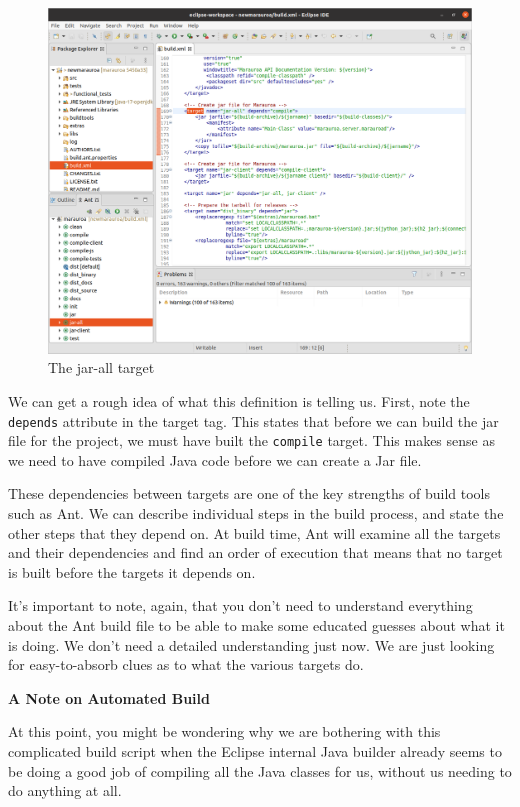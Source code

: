 \documentclass[
]{book}
\begin{document}
\begin{figure}

{\centering \includegraphics[width=1\linewidth]{images/2.1jarallTarget} 

}

\caption{The jar-all target}\label{fig:jarallTarget-fig}
\end{figure}

We can get a rough idea of what this definition is telling us. First, note the \texttt{depends} attribute in the target tag. This states that before we can build the jar file for the project, we must have built the \texttt{compile} target. This makes sense as we need to have compiled Java code before we can create a Jar file.

These dependencies between targets are one of the key strengths of build tools such as Ant. We can describe individual steps in the build process, and state the other steps that they depend on. At build time, Ant will examine all the targets and their dependencies and find an order of execution that means that no target is built before the targets it depends on.

It's important to note, again, that you don't need to understand everything about the Ant build file to be able to make some educated guesses about what it is doing. We don't need a detailed understanding just now. We are just looking for easy-to-absorb clues as to what the various targets do.

\textbf{A Note on Automated Build}

At this point, you might be wondering why we are bothering with this complicated build script when the Eclipse internal Java builder already seems to be doing a good job of compiling all the Java classes for us, without us needing to do anything at all.
\end{document}
